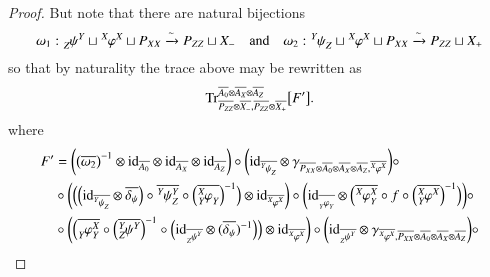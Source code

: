 \documentclass{amsart}
\def\tn{\textnormal}
\def\Trace{\tn{Tr}}
\def\ol{\overline}
\newcommand{\To}[1]{\xrightarrow{#1}}
\def\id{\tn{id}}
\newcommand{\inp}[1]{{#1_-}}
\newcommand{\outp}[1]{{#1_+}}
\newcommand{\feeddd}[3]{{\tensor*[^{#2}_{\color{white}{!}}]{{#1}}{^{#3}}}}%
\newcommand{\feeddc}[3]{{\tensor*[^{#2}]{{#1}}{_{#3}}}}
\newcommand{\feedcd}[3]{{\tensor*[_{#2}]{{#1}}{^{#3}}}}
\newcommand{\feedcc}[3]{{\tensor*[^{\color{white}{!}}_{#2}]{{#1}}{_{#3}}}}
\newcommand{\feedda}[3]{{\tensor*[^{#2}_{\color{white}{!}}]{{#1}}{^{#2}_{#3}}}}
\newcommand{\feedca}[3]{{\tensor*[_{#2}]{{#1}}{_{#2}^{#3}}}}
\newcommand{\feedad}[3]{{\tensor*[^{#2}_{#3}]{{#1}}{^{#2}}}}
\newcommand{\feedac}[3]{{\tensor*[_{#2}^{#3}]{{#1}}{_{#2}}}}
\theoremstyle{remark}
\theoremstyle{definition}
\begin{document}
\begin{proof}
But note that there are natural bijections 
\[\omega_1:\feedcd{\psi}{Z}{Y}\sqcup\feeddd{\varphi}{X}{X}\sqcup P_{XX}\To{\sim}P_{ZZ}\sqcup\inp{X}\quad\text{and}\quad \omega_2:\feeddc{\psi}{Y}{Z}\sqcup\feeddd{\varphi}{X}{X}\sqcup P_{XX}\To{\sim}P_{ZZ}\sqcup\outp{X}\]
so that by naturality the trace above may be rewritten as
\begin{equation}\label{eq:internal trace}
\Trace^{\ol{A_0}\otimes\ol{A_X}\otimes\ol{A_Z}}_{\ol{P_{ZZ}}\otimes\ol{\inp{X}},\ol{P_{ZZ}}\otimes\ol{\outp{X}}}
\big[F'\big].
\end{equation}
where
\begin{align*}
F'
&=\bigg(\big(\ol{\omega_2}\big)^{-1}\otimes\id_{\ol{A_0}}\otimes\id_{\ol{A_X}}\otimes\id_{\ol{A_Z}}\bigg)\circ\bigg(\id_{\ol{\feeddc{\psi}{Y}{Z}}}\otimes\gamma_{\ol{P_{XX}}\otimes\ol{A_0}\otimes\ol{A_X}\otimes\ol{A_Z},\ol{\feeddd{\varphi}{X}{X}}}\bigg)\circ\\
&\circ\bigg(\Big(\Big(\id_{\ol{\feeddc{\psi}{Y}{Z}}}\otimes\ol{\delta_\psi}\Big)\circ\ol{\feedda{\psi}{Y}{Z}}\circ\Big(\ol{\feedac{\varphi}{Y}{X}}\Big)^{-1}\Big)\otimes\id_{\ol{\feeddd{\varphi}{X}{X}}}\bigg)\circ\bigg(\id_{\ol{\feedcc{\varphi}{Y}{Y}}}\otimes\Big(\ol{\feedda{\varphi}{X}{Y}}\circ f\circ\Big(\ol{\feedad{\varphi}{X}{Y}}\Big)^{-1}\Big)\bigg)\circ\\
&\circ\bigg(\Big(\ol{\feedca{\varphi}{Y}{X}}\circ\Big(\ol{\feedad{\psi}{Y}{Z}}\Big)^{-1}\circ\Big(\id_{\ol{\feedcd{\psi}{Z}{Y}}}\otimes(\ol{\delta_\psi})^{-1}\Big)\Big)\otimes\id_{\ol{\feeddd{\varphi}{X}{X}}}\bigg)\circ\bigg(\id_{\ol{\feedcd{\psi}{Z}{Y}}}\otimes\gamma_{\ol{\feeddd{\varphi}{X}{X}},\ol{P_{XX}}\otimes\ol{A_0}\otimes\ol{A_X}\otimes\ol{A_Z}}\bigg)\circ\\

\end{align*}
\end{proof}
\end{document}
